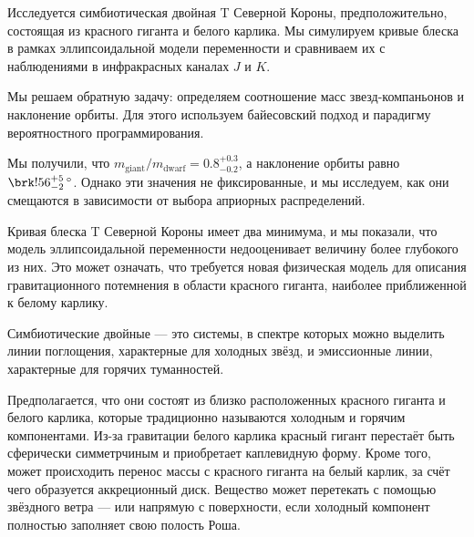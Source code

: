 

\usepackage{microtype}
\usepackage[extdef]{delimset}
\usepackage{csquotes} %
\usepackage{ragged2e}
\usepackage[hidelinks]{hyperref}
\usepackage{subfig}
\usepackage{tabularray}
\usepackage{epigraph}


\renewcommand{\div}{\operatorname{div}}




\setcounter{page}{2}



\newcommand{\resultq}{0.8^{+0.3}_{-0.2}}
\newcommand{\resulti}{\brk!{56^{+5}_{-2}}\, {}^\circ}


Исследуется симбиотическая двойная T Северной Короны, предположительно, состоящая из красного гиганта и белого карлика. Мы симулируем кривые блеска в рамках эллипсоидальной модели переменности и сравниваем их с наблюдениями в инфракрасных каналах $J$ и $K$.

Мы решаем обратную задачу: определяем соотношение масс звезд-компаньонов и наклонение орбиты. Для этого используем байесовский подход и парадигму вероятностного программирования.

Мы получили, что $m_\text{giant} / m_\text{dwarf} = \resultq$, а наклонение орбиты равно $\resulti$. Однако эти значения не фиксированные, и мы исследуем, как они смещаются в зависимости от выбора априорных распределений.

Кривая блеска T Северной Короны имеет два минимума, и мы показали, что модель эллипсоидальной переменности недооценивает величину более глубокого из них. Это может означать, что требуется новая физическая модель для описания гравитационного потемнения в области красного гиганта, наиболее приближенной к белому карлику.





Симбиотические двойные — это системы, в спектре которых можно выделить линии поглощения, характерные для холодных звёзд, и эмиссионные линии, характерные для горячих туманностей.

Предполагается, что они состоят из близко расположенных красного гиганта и белого карлика, которые традиционно называются холодным и горячим компонентами. Из-за гравитации белого карлика красный гигант перестаёт быть сферически симметрчиным и приобретает каплевидную форму. Кроме того, может происходить перенос массы с красного гиганта на белый карлик, за счёт чего образуется аккреционный диск. Вещество может перетекать с помощью звёздного ветра --- или напрямую с поверхности, если холодный компонент полностью заполняет свою полость Роша.

